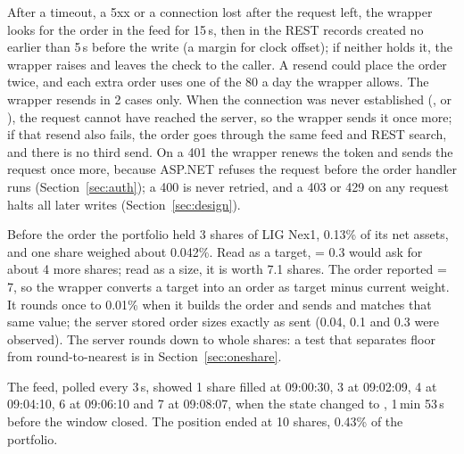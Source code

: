  After a timeout, a 5xx or a connection lost after the request left, the wrapper looks for the order in the feed for 15\,s, then in the REST  records created no earlier than 5\,s before the write (a margin for clock offset); if neither holds it, the wrapper raises  and leaves the check to the caller. A resend could place the order twice, and each extra order uses one of the 80 a day the wrapper allows. The wrapper resends  in 2 cases only. When the connection was never established (,  or ), the request cannot have reached the server, so the wrapper sends it once more; if that resend also fails, the order goes through the same feed and REST search, and there is no third send. On a 401 the wrapper renews the token and sends the request once more, because ASP.NET refuses the request before the order handler runs (Section~\ref{sec:auth}); a 400 is never retried, and a 403 or 429 on any request halts all later writes (Section~\ref{sec:design}).



 Before the order the portfolio held 3 shares of LIG Nex1, 0.13\% of its net assets, and one share weighed about 0.042\%. Read as a target,  = 0.3 would ask for about 4 more shares; read as a size, it is worth 7.1 shares. The order reported  = 7, so the wrapper converts a target into an order as target minus current weight. It rounds  once to 0.01\% when it builds the order and sends and matches that same value; the server stored order sizes exactly as sent (0.04, 0.1 and 0.3 were observed). The server rounds  down to whole shares: a test that separates floor from round-to-nearest is in Section~\ref{sec:oneshare}.

 The feed, polled every 3\,s, showed 1 share filled at 09:00:30, 3 at 09:02:09, 4 at 09:04:10, 6 at 09:06:10 and 7 at 09:08:07, when the state changed to , 1\,min 53\,s before the window closed. The position ended at 10 shares, 0.43\% of the portfolio.

